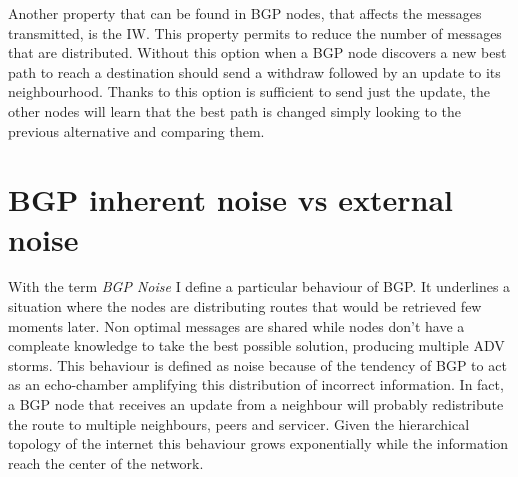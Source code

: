 Another property that can be found in \ac{BGP} nodes, that affects the messages
transmitted, is the \ac{IW}.
This property permits to reduce the number of messages that are distributed.
Without this option when a \ac{BGP} node discovers a new best path to reach
a destination should send a withdraw followed by an update to its neighbourhood.
Thanks to this option is sufficient to send just the update, the other nodes
will learn that the best path is changed simply looking to the previous
alternative and comparing them.


%

\section{BGP inherent noise vs external noise}
\label{sec:bgp_noise}

With the term \textit{BGP Noise} I define a particular behaviour
of \ac{BGP}.
It underlines a situation where the nodes are distributing routes
that would be retrieved few moments later.
Non optimal messages are shared while nodes don't have a compleate knowledge
to take the best possible solution, producing multiple \ac{ADV} storms.
This behaviour is defined as noise because of the tendency of \ac{BGP} to act
as an echo-chamber amplifying this distribution of incorrect information.
In fact, a \ac{BGP} node that receives an update from a neighbour will probably
redistribute the route to multiple neighbours, peers and servicer.
Given the hierarchical topology of the internet this behaviour grows
exponentially while the information reach the center of the network.

